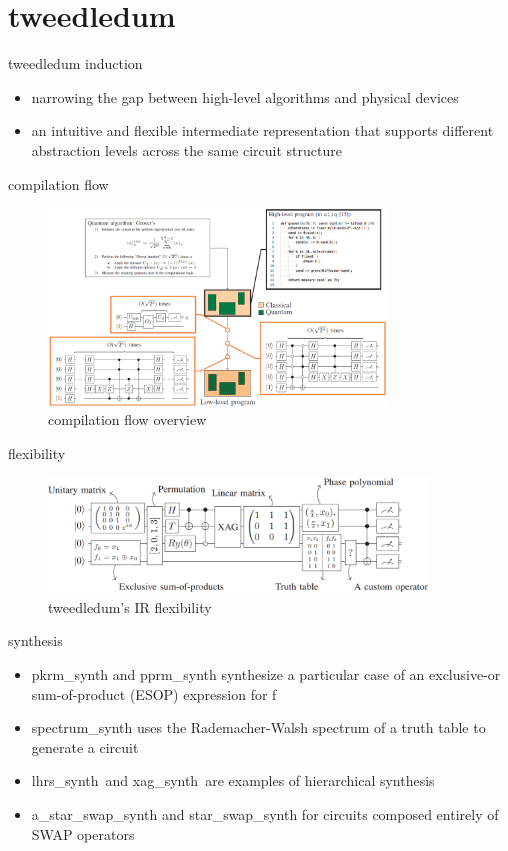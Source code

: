 \section{tweedledum}
\begin{frame}{tweedledum induction}  
  \begin{itemize}
    \item  narrowing the gap between high-level algorithms and physical devices
    \item  an intuitive and flexible intermediate representation that supports different abstraction levels across the  same  circuit  structure
  \end{itemize}
\end{frame}
\begin{frame}{compilation flow}
  \begin{figure}[htbq]
    \centering
    \includegraphics[width=0.8\textwidth]{figure/work_flow.png}
    \caption{compilation flow overview} 
    \label{fig-compilation}
  \end{figure}
\end{frame}
\begin{frame}{flexibility}
  \begin{figure}[htbq]
    \centering
    \includegraphics[width=0.9\textwidth]{figure/flex.png}
    \caption{tweedledum's IR flexibility} 
    \label{fig-flex}
  \end{figure}
\end{frame}
\begin{frame}{synthesis}
  \begin{itemize}
    \item pkrm\_synth and pprm\_synth synthesize a particular case of an exclusive-or sum-of-product (ESOP) expression for f
    \item spectrum\_synth uses the Rademacher-Walsh spectrum of a truth table to generate a circuit
    \item lhrs\_synth\ and xag\_synth\ are examples of hierarchical synthesis
    \item a\_star\_swap\_synth and star\_swap\_synth for circuits composed entirely of SWAP operators
  \end{itemize}  
\end{frame}
